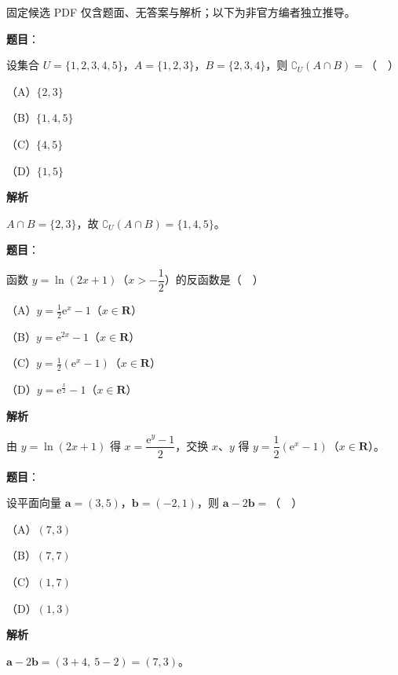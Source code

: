 

\begin{gktip}
固定候选 PDF 仅含题面、无答案与解析；以下为非官方编者独立推导。
\end{gktip}

\begin{answer}

\textbf{题目}：

设集合 $U=\{1,2,3,4,5\}$，$A=\{1,2,3\}$，$B=\{2,3,4\}$，则 $\complement_U(A\cap B)=$（　）

（A）$\{2,3\}$

（B）$\{1,4,5\}$

（C）$\{4,5\}$

（D）$\{1,5\}$

\textbf{解析}

$A\cap B=\{2,3\}$，故 $\complement_U(A\cap B)=\{1,4,5\}$。


\end{answer}
\begin{answer}

\textbf{题目}：

函数 $y=\ln(2x+1)$（$x>-\dfrac12$）的反函数是（　）

（A）$y=\frac12\mathrm e^x-1$（$x\in\mathbf R$）

（B）$y=\mathrm e^{2x}-1$（$x\in\mathbf R$）

（C）$y=\frac12(\mathrm e^x-1)$（$x\in\mathbf R$）

（D）$y=\mathrm e^{\frac x2}-1$（$x\in\mathbf R$）

\textbf{解析}

由 $y=\ln(2x+1)$ 得 $x=\dfrac{\mathrm e^y-1}2$，交换 $x$、$y$ 得 $y=\dfrac12(\mathrm e^x-1)$（$x\in\mathbf R$）。


\end{answer}
\begin{answer}

\textbf{题目}：

设平面向量 $\boldsymbol a=(3,5)$，$\boldsymbol b=(-2,1)$，则 $\boldsymbol a-2\boldsymbol b=$（　）

（A）$(7,3)$

（B）$(7,7)$

（C）$(1,7)$

（D）$(1,3)$

\textbf{解析}

$\boldsymbol a-2\boldsymbol b=(3+4,\ 5-2)=(7,3)$。


\end{answer}

